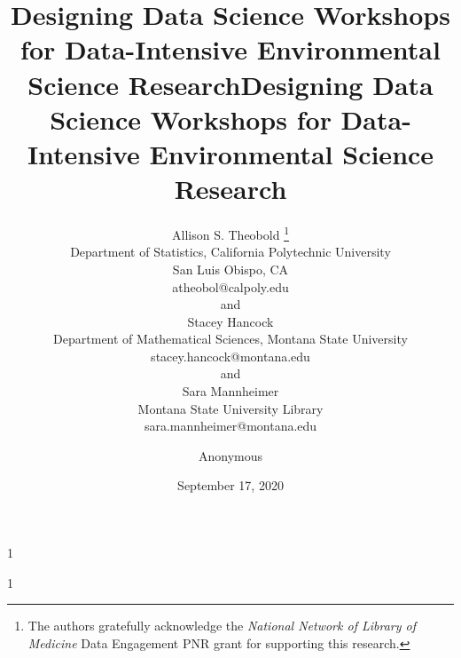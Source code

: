 \documentclass[12pt]{article}
\date{September 17, 2020}
\newcommand{\blind}{1}
\begin{document}
\def\spacingset#1{\renewcommand{\baselinestretch}%
{#1}\small\normalsize} \spacingset{1}



\blind
{
  \title{\bf Designing Data Science Workshops for Data-Intensive Environmental 
  Science Research}
  \author{Allison S. Theobold \thanks{The authors gratefully acknowledge the 
  \textit{National Network of Library of Medicine}
    Data Engagement PNR grant for supporting this research.} \hspace{.2cm}\\
    Department of Statistics, California Polytechnic University \\
    San Luis Obispo, CA \\
    atheobol@calpoly.edu \\
    and \\
    Stacey Hancock \\
    Department of Mathematical Sciences, Montana State University \\
    stacey.hancock@montana.edu \\
    and \\
    Sara Mannheimer \\
    Montana State University Library \\
    sara.mannheimer@montana.edu
    }
  \maketitle 
} \fi

\blind
{
  \title{\bf Designing Data Science Workshops for Data-Intensive Environmental
  Science Research}
  \author{Anonymous}
  \date{}
  \maketitle
} \fi

\bigskip
\end{document}
